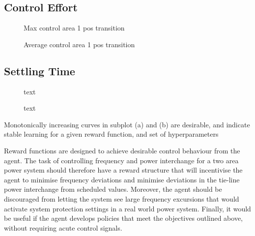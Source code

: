 \subsection{Control Effort}

\begin{figure}[h]
	\begin{minipage}{0.45\textwidth}
		\centering
		\resizebox{7cm}{!}{}
		\caption{Max control area 1 pos transition}
	\end{minipage}
	\hspace{0.5cm}
	\begin{minipage}{0.45\textwidth}
		\resizebox{7cm}{!}{}
		\caption{Average control area 1 pos transition}
	\end{minipage}
\end{figure}

\subsection{Settling Time}

\begin{figure}[h]
	\begin{minipage}{0.45\textwidth}
		\centering
		\resizebox{7cm}{!}{}
		\caption{text}
	\end{minipage}
	\hspace{0.5cm}
	\begin{minipage}{0.45\textwidth}
		\resizebox{7cm}{!}{}
		\caption{text}
	\end{minipage}
\end{figure}

Monotonically increasing curves in subplot (a) and (b) are desirable, and indicate stable learning for a given reward function, and set of hyperparameters

Reward functions are designed to achieve desirable control behaviour from the agent. The task of controlling frequency and power interchange for a two area power system should therefore have a reward structure that will incentivise the agent to minimise frequency deviations and minimise deviations in the tie-line power interchange from scheduled values. Moreover, the agent should be discouraged from letting the system see large frequency excursions that would activate system protection settings in a real world power system. Finally, it would be useful if the agent develops policies that meet the objectives outlined above, without requiring acute control signals.

